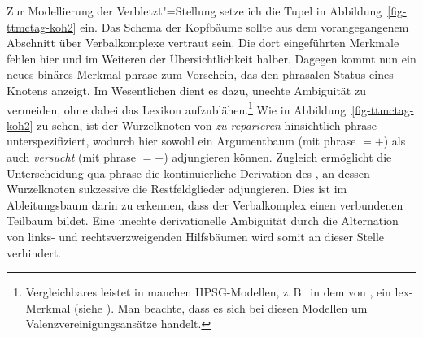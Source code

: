 Zur Modellierung der Verbletzt"=Stellung setze ich die Tupel in Abbildung~\ref{fig-ttmctag-koh2} ein. Das Schema der Kopfbäume sollte aus dem vorangegangenem Abschnitt über Verbalkomplexe vertraut sein. Die dort eingeführten Merkmale fehlen hier und im Weiteren der Übersichtlichkeit halber. Dagegen kommt nun ein neues binäres Merkmal {\sc phrase} zum Vorschein, das den phrasalen Status eines Knotens anzeigt. Im Wesentlichen dient es dazu, unechte Ambiguität zu vermeiden, ohne dabei das Lexikon aufzublähen.\footnote{Vergleichbares leistet in manchen HPSG-Modellen, z.\,B.\ in dem von \cite{Hinrichs:Nakazawa:94}, ein {\sc lex}-Merkmal (siehe \citealt{Mueller:96b,Mueller:97, Meurers:99b}). Man beachte, dass es sich bei diesen Modellen um Valenzvereinigungsansätze handelt.} Wie in Abbildung~\ref{fig-ttmctag-koh2} zu sehen, ist der Wurzelknoten von {\it zu reparieren} hinsichtlich {\sc phrase} unterspezifiziert, wodurch hier sowohl ein Argumentbaum (mit {\sc phrase} $ = +$) als auch {\it versucht} (mit {\sc phrase} $ = -$) adjungieren können. Zugleich ermöglicht die Unterscheidung qua {\sc phrase} die kontinuierliche Derivation des , an dessen Wurzelknoten sukzessive die Restfeldglieder adjungieren. Dies ist im Ableitungsbaum darin zu erkennen, dass der Verbalkomplex einen verbundenen Teilbaum bildet. Eine unechte derivationelle Ambiguität durch die Alternation von links- und rechtsverzweigenden Hilfsbäumen wird somit an dieser Stelle verhindert. 

